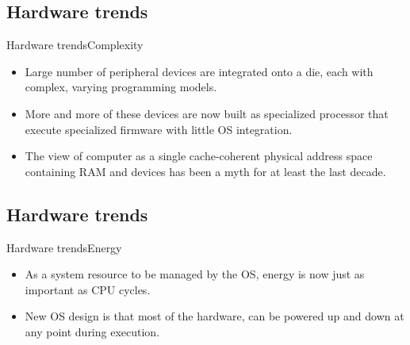 \documentclass[10pt]{beamer}
\begin{document}
\subsection{Hardware trends}
\begin{frame}{Hardware trends}{Complexity}
  \begin{itemize}
    \item Large number of peripheral devices are integrated onto a die, each
          with complex, varying programming models.
    \item More and more of these devices are now built as specialized processor
          that execute specialized firmware with little OS integration.
    \item The view of computer as a single cache-coherent physical address
          space containing RAM and devices has been a myth for at least the
          last decade.
  \end{itemize}
\end{frame}

\subsection{Hardware trends}
\begin{frame}{Hardware trends}{Energy}
  \begin{itemize}
    \item As a system resource to be managed by the OS, energy is now just as
          important as CPU cycles.
    \item New OS design is that most of the hardware, can be powered up and
          down at any point during execution.
  \end{itemize}
\end{frame}
     

\end{document}
